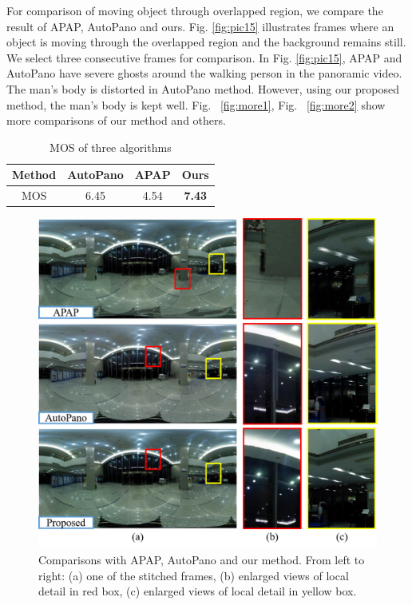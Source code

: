 \documentclass[conference]{IEEEtran}
\begin{document}
For comparison of moving object through overlapped region, we compare the result of APAP, AutoPano and ours. Fig. \ref{fig:pic15} 
illustrates frames where an object is moving through the overlapped region and the background remains still. 
We select three consecutive frames for comparison. In Fig. \ref{fig:pic15}, APAP and AutoPano have severe ghosts around the walking person in the panoramic video. 
The man's body is distorted in AutoPano method. However, using our proposed method, the man's body is kept well. 
Fig. ~\ref{fig:more1}, Fig. ~\ref{fig:more2} show more comparisons of our method and others.
\begin{table}[!htpb]
\caption{MOS of three algorithms}
\label{tab1:table1}
\centering
\begin{tabular}{c|c|c|c}
\hline
Method& AutoPano& APAP& Ours\\
\hline
MOS& 6.45& 4.54& \bf{7.43}\\
\hline
\end{tabular}
\end{table}
\begin{figure}[!htpb]
\centering
\includegraphics[scale=0.415]{picture35.png}
\caption{Comparisons with APAP, AutoPano and our method. From left to right: (a) one of the stitched frames, (b) enlarged views of local
detail in red box, (c) enlarged views of local detail in yellow box.}
\label{fig:pic17}
\end{figure}
\end{document}

